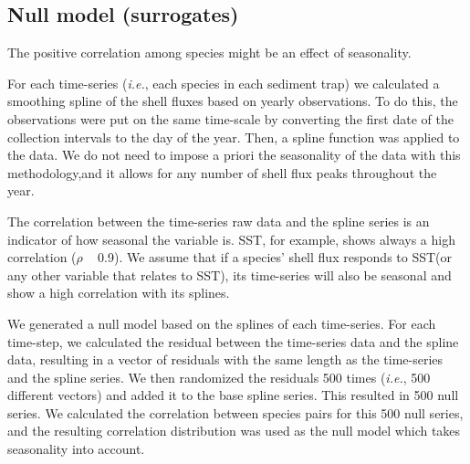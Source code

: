 \subsection{Null model (surrogates)}
The positive correlation among species might be an effect of seasonality. 

For each time-series (\textit{i.e.}, each species in each sediment trap) we calculated a smoothing spline of the shell fluxes based on yearly observations. To do this, the observations were put on the same time-scale by converting the first date of the collection intervals to the day of the year. Then, a spline function was applied to the data.
We do not need to impose a priori the seasonality of the data with this methodology,and it allows for any number of shell flux peaks throughout the year.

The correlation between the time-series raw data and the spline series is an indicator of how seasonal the variable is. SST, for example, shows always a high correlation ($\rho$ ~ 0.9). We assume that if a species' shell flux responds to SST(or any other variable that relates to SST), its time-series will also be seasonal and show a high correlation with its splines. 

We generated a null model based on the splines of each time-series. For each time-step, we calculated the residual between the time-series data and the spline data, resulting in a vector of residuals with the same length as the time-series and the spline series. We then randomized the residuals 500 times (\textit{i.e.}, 500 different vectors) and added it to the base spline series. This resulted in 500 null series. We calculated the correlation between species pairs for this 500 null series, and the resulting correlation distribution was used as the null model which takes seasonality into account. 

